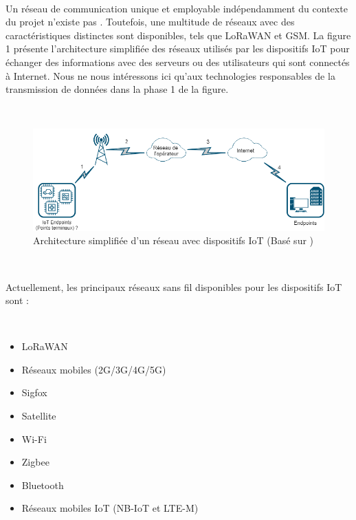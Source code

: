 ~

\noindent
Un réseau de communication unique et employable indépendamment du contexte du projet n'existe pas \cite{vannieuwenborg_iot}. Toutefois, une multitude de réseaux avec des caractéristiques distinctes sont disponibles, tels que LoRaWAN et GSM. La figure 1 présente l'architecture simplifiée des réseaux utilisés par les dispositifs IoT pour échanger des informations avec des serveurs ou des utilisateurs qui sont connectés à Internet. Nous ne nous intéressons ici qu'aux technologies responsables de la transmission de données dans la phase 1 de la figure.

~

\begin{figure}[ht!]
  \includegraphics[width=\textwidth]{img/state_of_the_art/network_iot.png}
  \caption{Architecture simplifiée d'un réseau avec dispositifs IoT (Basé sur \cite{sanchez2016state, mekki2018overview})}
  \label{fig:network_archi}
\end{figure}

~

\noindent
Actuellement, les principaux réseaux sans fil disponibles pour les dispositifs IoT sont :

~

\begin{itemize}
  \item LoRaWAN
  \item Réseaux mobiles (2G/3G/4G/5G)
  \item Sigfox
  \item Satellite
  \item Wi-Fi
  \item Zigbee
  \item Bluetooth
  \item Réseaux mobiles IoT (NB-IoT et LTE-M)
\end{itemize}

~

